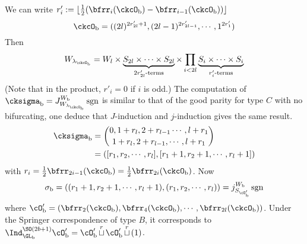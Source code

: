 \documentclass[12pt]{amsart}
\newcommand{\sgn}{\operatorname{sgn}}
\numberwithin{equation}{section}
\theoremstyle{remark}
\def\half{{\tfrac{1}{2}}}
\def\floor#1{{\lfloor #1 \rfloor}}
\def\lamckb{\lambda_{\ckcO_{\mathrm b}}}
\def\cuprow{{\stackrel{r}{\sqcup}}}
\def\cuprow{{\,\stackrel{r}{\sqcup}\,}}
\begin{document}
{{      We can write
      $r'_{i} := \floor{\half(\bfrr_{i}(\ckcO_{\mathrm b})-\bfrr_{i-1}(\ckcO_{\mathrm b}))}$
      \[
        \ckcO_{\mathrm b} %
        = ((2l)^{2r'_{2l}+1}, (2l-1)^{2r'_{2l-1}},\cdots, 1^{2r'_{1}})
      \]
      Then
      \[
        W_{\lamckb} = W_{l} \times \underbrace{S_{2l}\times \cdots \times S_{2l}}_{2r'_{2l}\text{-terms}} \times \prod_{i<2l} \underbrace{S_{i}\times \cdots\times S_{i}}_{r'_{i}\text{-terms}}
      \]
      (Note that in the product, $r'_{i}=0$ if $i$ is odd.) The computation of
      $\cksigma_{\mathrm b} = J_{W_{\lamckb}}^{W_{\mathrm b}} \sgn$ is similar to that of the
      good parity for type $C$ with no bifurcating, one deduce that
      $J$-induction and $j$-induction gives the same result.
      \[
        \begin{split}
          \cksigma_{\mathrm b} &=
          \binom{0, 1+r_{l}, 2+r_{l-1}\cdots, l+r_{1}}{1+r_{l},2+r_{l-1}, \cdots, l+r_{1}}\\
          & = ([r_{1},r_{2},\cdots, r_{l}],[r_{1}+1,r_{2}+1,\cdots,r_{l}+1])\\
        \end{split}
      \]
      with $r_{i} = \half\bfrr_{2i-1}(\ckcO_{\mathrm b}) = \half\bfrr_{2i}(\ckcO_{\mathrm b})$.
      Now
      \[
        \sigma_{\mathrm b} = ((r_{1}+1,r_{2}+1,\cdots,r_{l}+1), (r_{1},r_{2},\cdots, r_{l})) = j_{S_{\cO'_{\mathrm b}}}^{W_{\mathrm b}}\sgn
      \]
      where
      $\cO'_{\mathrm b}=(\bfrr_{2}(\ckcO_{\mathrm b}),\bfrr_{4}(\ckcO_{\mathrm b}),\cdots, \bfrr_{2l}(\ckcO_{\mathrm b}))$.
      Under the Springer correspondence of type $B$, it corresponds to
      $\Ind_{\GL_{\mathrm b}}^{\SO(2b+1)}\cO'_{\mathrm b} = \cO'_{\mathrm b}\cuprow \cO'_{\mathrm b}\cuprow (1)$.



}}
\end{document}
